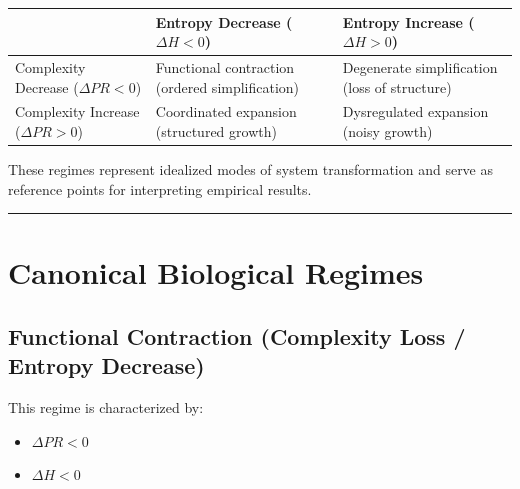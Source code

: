 \documentclass[
  letterpaper,
  DIV=11,
  numbers=noendperiod,
  openany,
  oneside]{scrreprt}
\providecommand{\tightlist}{%
  \setlength{\itemsep}{0pt}\setlength{\parskip}{0pt}}
\begin{document}
\begin{longtable}[]{@{}
  >{\raggedright\arraybackslash}p{}
  >{\raggedright\arraybackslash}p{}
  >{\raggedright\arraybackslash}p{}@{}}
\toprule\noalign{}
\begin{minipage}[b]{\linewidth}\raggedright
\end{minipage} & \begin{minipage}[b]{\linewidth}\raggedright
Entropy Decrease (\(\Delta H < 0\))
\end{minipage} & \begin{minipage}[b]{\linewidth}\raggedright
Entropy Increase (\(\Delta H > 0\))
\end{minipage} \\
\midrule\noalign{}
\endhead
\bottomrule\noalign{}
\endlastfoot
Complexity Decrease (\(\Delta PR < 0\)) & Functional contraction
(ordered simplification) & Degenerate simplification (loss of
structure) \\
Complexity Increase (\(\Delta PR > 0\)) & Coordinated expansion
(structured growth) & Dysregulated expansion (noisy growth) \\
\end{longtable}

These regimes represent idealized modes of system transformation and
serve as reference points for interpreting empirical results.

\begin{center}\rule{0.5\linewidth}{0.5pt}\end{center}

\section{Canonical Biological
Regimes}\label{canonical-biological-regimes}

\subsection{Functional Contraction (Complexity Loss / Entropy
Decrease)}\label{functional-contraction-complexity-loss-entropy-decrease}

This regime is characterized by:

\begin{itemize}
\tightlist
\item
  \(\Delta PR < 0\)\\
\item
  \(\Delta H < 0\)
\end{itemize}
\end{document}
